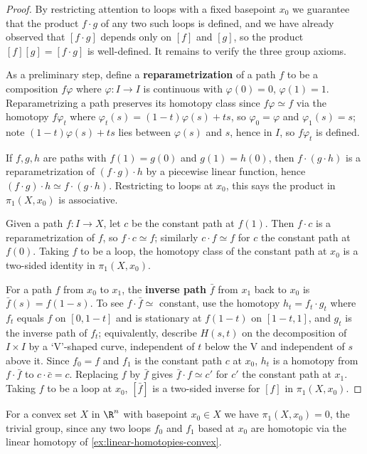 \begin{proof}
By restricting attention to loops with a fixed basepoint $x_0$ we guarantee that the
product $f \cdot g$ of any two such loops is defined, and we have already observed that
$[f \cdot g]$ depends only on $[f]$ and $[g]$, so the product $[f][g] = [f \cdot g]$ is
well-defined. It remains to verify the three group axioms.

As a preliminary step, define a \textbf{reparametrization} of a path $f$ to be a
composition $f\varphi$ where $\varphi : I \to I$ is continuous with $\varphi(0)=0$, $\varphi(1)=1$.
Reparametrizing a path preserves its homotopy class since $f\varphi \simeq f$ via the
homotopy $f\varphi_t$ where $\varphi_t(s) = (1-t)\varphi(s) + ts$, so $\varphi_0 = \varphi$ and $\varphi_1(s) = s$; note
$(1-t)\varphi(s)+ts$ lies between $\varphi(s)$ and $s$, hence in $I$, so $f\varphi_t$ is defined.

If $f,g,h$ are paths with $f(1)=g(0)$ and $g(1)=h(0)$, then $f\cdot(g\cdot h)$ is a
reparametrization of $(f\cdot g)\cdot h$ by a piecewise linear function, hence
$(f\cdot g)\cdot h \simeq f\cdot(g\cdot h)$. Restricting to loops at $x_0$, this says the product in
$\pi_1(X,x_0)$ is associative.

Given a path $f : I \to X$, let $c$ be the constant path at $f(1)$. Then $f \cdot c$ is a
reparametrization of $f$, so $f \cdot c \simeq f$; similarly $c \cdot f \simeq f$ for $c$ the constant path
at $f(0)$. Taking $f$ to be a loop, the homotopy class of the constant path at $x_0$ is a
two-sided identity in $\pi_1(X,x_0)$.

For a path $f$ from $x_0$ to $x_1$, the \textbf{inverse path} $\bar f$ from $x_1$ back to $x_0$ is
$\bar f(s) = f(1-s)$. To see $f \cdot \bar f \simeq$ constant, use the homotopy $h_t = f_t \cdot g_t$ where
$f_t$ equals $f$ on $[0,1-t]$ and is stationary at $f(1-t)$ on $[1-t,1]$, and $g_t$ is the
inverse path of $f_t$; equivalently, describe $H(s,t)$ on the decomposition of $I\times I$
by a `V'-shaped curve, independent of $t$ below the V and independent of $s$ above
it. Since $f_0 = f$ and $f_1$ is the constant path $c$ at $x_0$, $h_t$ is a homotopy from
$f \cdot \bar f$ to $c \cdot \bar c = c$. Replacing $f$ by $\bar f$ gives $\bar f \cdot f \simeq c'$ for $c'$ the constant path
at $x_1$. Taking $f$ to be a loop at $x_0$, $[\bar f]$ is a two-sided inverse for $[f]$ in
$\pi_1(X,x_0)$.
\end{proof}

\begin{example}
\label{ex:convex-set-trivial-pi1}
For a convex set $X$ in $\R^n$ with basepoint $x_0 \in X$ we have $\pi_1(X,x_0) = 0$, the
trivial group, since any two loops $f_0$ and $f_1$ based at $x_0$ are homotopic via the
linear homotopy of \cref{ex:linear-homotopies-convex}.
\end{example}

